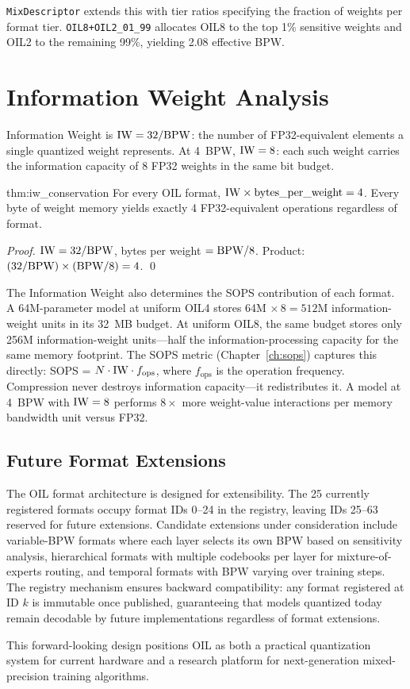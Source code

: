 \texttt{MixDescriptor} extends this with tier ratios specifying the
fraction of weights per format tier. \texttt{OIL8+OIL2\_01\_99}
allocates OIL8 to the top 1\% sensitive weights and OIL2 to the
remaining 99\%, yielding 2.08 effective BPW.

\section{Information Weight Analysis}
\label{sec:iw_analysis}

Information Weight is $\mathrm{IW} = 32 / \textnormal{BPW}$: the number of FP32-equivalent
elements a single quantized weight represents. At 4~BPW, $\mathrm{IW} = 8$:
each such weight carries the information capacity of 8 FP32 weights in
the same bit budget.

\begin{mythm}{thm:iw_conservation}
For every OIL format, $\mathrm{IW} \times \text{bytes\_per\_weight} = 4$.
Every byte of weight memory yields exactly 4 FP32-equivalent
operations regardless of format.
\end{mythm}

\begin{proof}
$\mathrm{IW} = 32 / \textnormal{BPW}$, bytes per weight $= \textnormal{BPW} / 8$.
Product: $(32 / \textnormal{BPW}) \times (\textnormal{BPW} / 8) = 4$. \qed
\end{proof}

The Information Weight also determines the SOPS contribution of each
format. A 64M-parameter model at uniform OIL4 stores 64M $\times\, 8 =
512$M information-weight units in its 32~MB budget. At uniform OIL8,
the same budget stores only 256M information-weight units---half the
information-processing capacity for the same memory footprint. The
SOPS metric (Chapter~\ref{ch:sops}) captures this directly: SOPS =
$N \cdot \mathrm{IW} \cdot f_{\text{ops}}$, where $f_{\text{ops}}$ is
the operation frequency. Compression never destroys information
capacity---it redistributes it. A model at 4~BPW with $\mathrm{IW} = 8$
performs $8\times$ more weight-value interactions per memory
bandwidth unit versus FP32.

\subsection{Future Format Extensions}

The OIL format architecture is designed for extensibility. The 25 currently registered formats occupy format IDs 0--24 in the registry, leaving IDs 25--63 reserved for future extensions. Candidate extensions under consideration include variable-BPW formats where each layer selects its own BPW based on sensitivity analysis, hierarchical formats with multiple codebooks per layer for mixture-of-experts routing, and temporal formats with BPW varying over training steps. The registry mechanism ensures backward compatibility: any format registered at ID $k$ is immutable once published, guaranteeing that models quantized today remain decodable by future implementations regardless of format extensions.

This forward-looking design positions OIL as both a practical quantization system for current hardware and a research platform for next-generation mixed-precision training algorithms.

